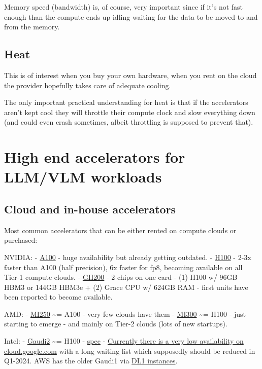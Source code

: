 \documentclass[
]{report}
\begin{document}
Memory speed (bandwidth) is, of course, very important since if it's not
fast enough than the compute ends up idling waiting for the data to be
moved to and from the memory.

\subsection{Heat}\label{heat}

This is of interest when you buy your own hardware, when you rent on the
cloud the provider hopefully takes care of adequate cooling.

The only important practical understanding for heat is that if the
accelerators aren't kept cool they will throttle their compute clock and
slow everything down (and could even crash sometimes, albeit throttling
is supposed to prevent that).

\section{High end accelerators for LLM/VLM
workloads}\label{high-end-accelerators-for-llmvlm-workloads}

\subsection{Cloud and in-house
accelerators}\label{cloud-and-in-house-accelerators}

Most common accelerators that can be either rented on compute clouds or
purchased:

NVIDIA: -
\href{https://www.nvidia.com/en-us/data-center/a100/\#specifications}{A100}
- huge availability but already getting outdated. -
\href{https://www.nvidia.com/en-us/data-center/h100}{H100} - 2-3x faster
than A100 (half precision), 6x faster for fp8, becoming available on all
Tier-1 compute clouds. -
\href{https://www.nvidia.com/en-us/data-center/grace-hopper-superchip/}{GH200}
- 2 chips on one card - (1) H100 w/ 96GB HBM3 or 144GB HBM3e + (2) Grace
CPU w/ 624GB RAM - first units have been reported to become available.

AMD: -
\href{https://www.amd.com/en/products/accelerators/instinct/mi200/mi250.html}{MI250}
\textasciitilde= A100 - very few clouds have them -
\href{https://www.amd.com/en/products/accelerators/instinct/mi300/mi300x.html}{MI300}
\textasciitilde= H100 - just starting to emerge - and mainly on Tier-2
clouds (lots of new startups).

Intel: - \href{https://habana.ai/products/gaudi2/}{Gaudi2}
\textasciitilde= H100 -
\href{https://docs.habana.ai/en/latest/Gaudi_Overview/Gaudi_Architecture.html}{spec}
- \href{https://cloud.google.com}{Currently there is a very low
availability on cloud.google.com} with a long waiting list which
supposedly should be reduced in Q1-2024. AWS has the older Gaudi1 via
\href{https://aws.amazon.com/ec2/instance-types/dl1/}{DL1 instances}.
\end{document}
